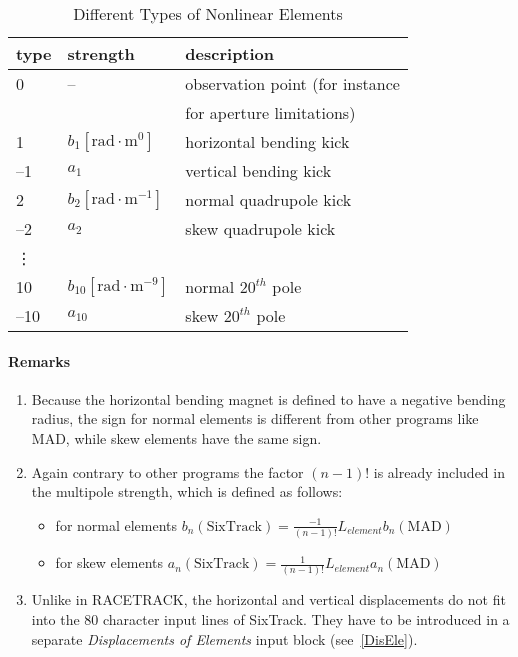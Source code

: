 \documentclass[a4paper,11pt]{report}
\begin{document}
\begin{table}[h]
\caption{Different Types of Nonlinear Elements}
\label{T-NonEle}
\centering
\begin{tabular}{|l|l|l|}
  \hline
  type & strength & description \\
  \hline 0 & -- & observation point (for
  instance \\
  & &
  for aperture limitations) \\
  \hline 1 & $ b_{1} [\mathrm{rad} \cdot \mathrm{m}^{0}] $ &
  horizontal bending kick \\
  --1 & $ a_{1} $ &
  vertical bending kick \\
  \hline 2 & $ b_{2} [\mathrm{rad} \cdot \mathrm{m}^{-1}] $ &
  normal quadrupole kick \\
  --2 & $ a_{2} $ &
  skew quadrupole kick \\
  \hline
  \vdots & & \\
  \hline 10 & $ b_{10} [\mathrm{rad} \cdot \mathrm{m}^{-9}] $ &
  normal $20^{th}$ pole \\
  --10 & $ a_{10} $ & skew $20^{th}$ pole \\
  \hline
\end{tabular}
\end{table}

\paragraph{Remarks}
\begin{enumerate}
\item Because the horizontal bending magnet is defined to have a
  negative bending radius, the sign for normal elements is different
  from other programs like MAD, while skew elements have the same
  sign.
\item Again contrary to other programs the factor \mbox{$(n-1)$!}  is
  already included in the multipole strength, which is defined as
  follows:
 \begin{itemize}
 \item for normal elements \mbox{$ b_{n}(\mathrm{SixTrack}) =
     \frac{-1}{(n-1)!}  L_{element} b_{n}(\mathrm{MAD}) $}
 \item for skew elements \mbox{$ a_{n}(\mathrm{SixTrack}) =
     \frac{1}{(n-1)!}  L_{element} a_{n}(\mathrm{MAD}) $}
 \end{itemize}
\item Unlike in RACETRACK, the horizontal and vertical displacements
  do not fit into the 80 character input lines of SixTrack\@.  They
  have to be introduced in a separate {\em Displacements of Elements}
  \/input block (see~\ref{DisEle}).
\end{enumerate}
\end{document}
